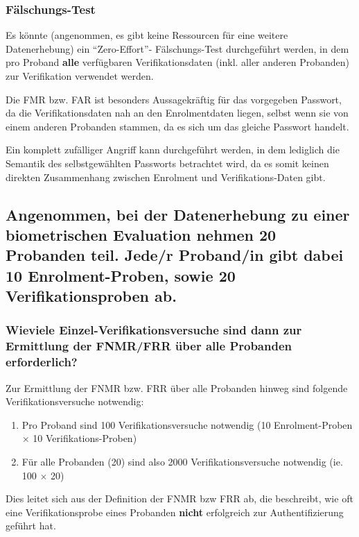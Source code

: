\documentclass{article}
\begin{document}
\subsubsection*{Fälschungs-Test}

Es könnte (angenommen, es gibt keine Ressourcen für eine weitere Datenerhebung) ein ``Zero-Effort''-
Fälschungs-Test durchgeführt werden, in dem pro Proband \textbf{alle} verfügbaren Verifikationsdaten 
(inkl. aller anderen Probanden) zur Verifikation verwendet werden.

Die FMR bzw. FAR ist besonders Aussagekräftig für das vorgegeben Passwort, da die Verifikationsdaten nah
an den Enrolmentdaten liegen, selbst wenn sie von einem anderen Probanden stammen, da es sich um das 
gleiche Passwort handelt. 

Ein komplett zufälliger Angriff kann durchgeführt werden, in dem lediglich die Semantik des 
selbstgewählten Passworts betrachtet wird, da es somit keinen direkten Zusammenhang zwischen
Enrolment und Verifikations-Daten gibt.

\subsection{Angenommen, bei der Datenerhebung zu einer biometrischen Evaluation nehmen 20 Probanden teil. Jede/r Proband/in gibt dabei 10 Enrolment-Proben, sowie 20 Verifikationsproben ab.}

\subsubsection{Wieviele Einzel-Verifikationsversuche sind dann zur Ermittlung der FNMR/FRR über alle Probanden erforderlich?}

Zur Ermittlung der FNMR bzw. FRR über alle Probanden hinweg sind folgende Verifikationsversuche notwendig:

\begin{enumerate}
	\item Pro Proband sind 100 Verifikationsversuche notwendig (10 Enrolment-Proben $\times$ 10 Verifikations-Proben)
	\item Für alle Probanden (20) sind also 2000 Verifikationsversuche notwendig (ie. 100 $\times$ 20)
\end{enumerate}

Dies leitet sich aus der Definition der FNMR bzw FRR ab, die beschreibt, wie oft eine Verifikationsprobe
eines Probanden \textbf{nicht} erfolgreich zur Authentifizierung geführt hat.
\end{document}
